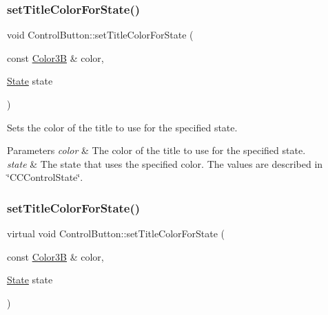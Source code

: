\subsubsection{\texorpdfstring{set\+Title\+Color\+For\+State()}{setTitleColorForState()}\hspace{0.1cm}{\footnotesize\ttfamily [1/2]}}
{\footnotesize\ttfamily void Control\+Button\+::set\+Title\+Color\+For\+State (\begin{DoxyParamCaption}\item[{const \hyperlink{structColor3B}{Color3B} \&}]{color,  }\item[{\hyperlink{classControl_a89e9598cd785841ac91cff3c4798c469}{State}}]{state }\end{DoxyParamCaption})\hspace{0.3cm}{\ttfamily [virtual]}}

Sets the color of the title to use for the specified state.


\begin{DoxyParams}{Parameters}
{\em color} & The color of the title to use for the specified state. \\
\hline
{\em state} & The state that uses the specified color. The values are described in \char`\"{}\+C\+C\+Control\+State\char`\"{}. \\
\hline
\end{DoxyParams}
\mbox{\label{classControlButton_af38b84f1d4d45058df227ce7a6eccde9}} 
\subsubsection{\texorpdfstring{set\+Title\+Color\+For\+State()}{setTitleColorForState()}\hspace{0.1cm}{\footnotesize\ttfamily [2/2]}}
{\footnotesize\ttfamily virtual void Control\+Button\+::set\+Title\+Color\+For\+State (\begin{DoxyParamCaption}\item[{const \hyperlink{structColor3B}{Color3B} \&}]{color,  }\item[{\hyperlink{classControl_a89e9598cd785841ac91cff3c4798c469}{State}}]{state }\end{DoxyParamCaption})\hspace{0.3cm}{\ttfamily [virtual]}}

